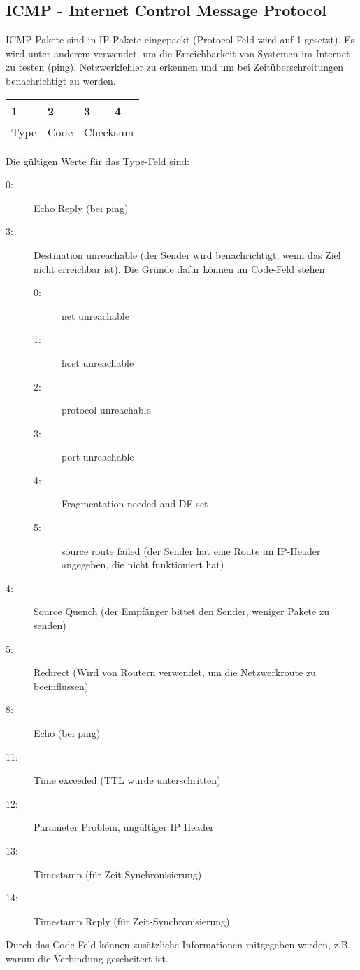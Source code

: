 \documentclass[a4paper,10pt]{scrartcl}
\begin{document}
    \subsection{ICMP - Internet Control Message Protocol}
        ICMP-Pakete sind in IP-Pakete eingepackt (Protocol-Feld wird auf 1 gesetzt). Es wird unter anderem verwendet, um  die Erreichbarkeit von Systemen im Internet zu testen (ping), Netzwerkfehler zu erkennen und um bei Zeitüberschreitungen benachrichtigt zu werden.\\
        \begin{tabular}{|p{3cm}|p{3cm}|p{3cm}|p{3cm}|}
            \toprule 
            1 & 2 & 3 & 4  \\
            \midrule\midrule
            Type & Code & \multicolumn{2}{|c|}{Checksum}\\
            \bottomrule
        \end{tabular}
        Die gültigen Werte für das Type-Feld sind:
        \begin{description}
            \item[0:] Echo Reply (bei ping)
            \item[3:] Destination unreachable (der Sender wird benachrichtigt, wenn das Ziel nicht erreichbar ist). Die Gründe dafür können im Code-Feld stehen
            \begin{description}
            \item[0:] net unreachable
            \item[1:] host unreachable
            \item[2:] protocol unreachable
            \item[3:] port unreachable
            \item[4:] Fragmentation needed and DF set
            \item[5:] source route failed (der Sender hat eine Route im IP-Header angegeben, die nicht funktioniert hat)
            \end{description}
            \item[4:] Source Quench (der Empfänger bittet den Sender, weniger Pakete zu senden)
            \item[5:] Redirect (Wird von Routern verwendet, um die Netzwerkroute zu beeinflussen)
            \item[8:] Echo (bei ping)
            \item[11:] Time exceeded (TTL wurde unterschritten)
            \item[12:] Parameter Problem, ungültiger IP Header
            \item[13:] Timestamp (für Zeit-Synchronisierung)
            \item[14:] Timestamp Reply (für Zeit-Synchronisierung)
        \end{description}
        Durch das Code-Feld können zusätzliche Informationen mitgegeben werden, z.B. warum die Verbindung gescheitert ist.
\end{document}

